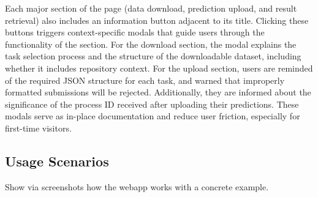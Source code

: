 Each major section of the page (data download, prediction upload, and result retrieval) also
includes an information button adjacent to its title. Clicking these buttons triggers
context-specific modals that guide users through the functionality of the section. For the download
section, the modal explains the task selection process and the structure of the downloadable
dataset, including whether it includes repository context. For the upload section, users are
reminded of the required JSON structure for each task, and warned that improperly formatted
submissions will be rejected. Additionally, they are informed about the significance of the process
ID received after uploading their predictions. These modals serve as in-place documentation and
reduce user friction, especially for first-time visitors.

\subsection{Usage Scenarios}

{\color{gray} Show via screenshots how the webapp works with a concrete example.}
\label{sec:refinement} %
\label{sec:paraphrases-check} %

